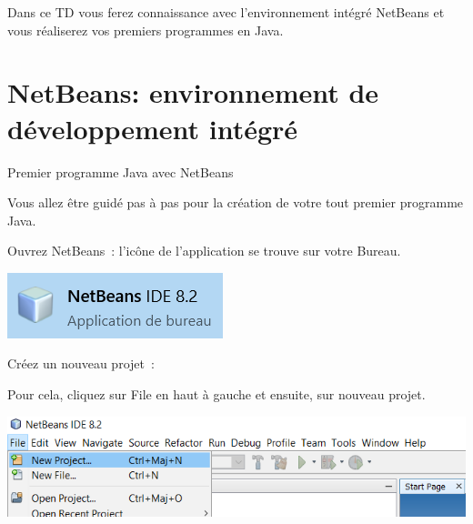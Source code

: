 \documentclass[a4paper,11pt]{article}
\date{2018 -- 2019}
\begin{document}
\entete
\titre

\lastedit


	Dans ce TD vous ferez connaissance avec l'environnement intégré NetBeans et 
	vous réaliserez vos premiers programmes en Java.

	\tableofcontents

	\newpage

\section{NetBeans: environnement de développement intégré }

	\begin{Tutoriel}{Premier programme Java avec NetBeans}
	
	Vous allez être guidé pas à pas pour la création de votre tout premier programme Java.
	
	\begin{steps}
		\item Ouvrez NetBeans~:
			l'icône de l'application se trouve sur votre Bureau. 
		
			\bigskip
			\begin{center}
				\includegraphics{images/nb_icone}
			\end{center}


		\item Créez un nouveau projet~: 
		
			Pour cela, cliquez sur \og File \fg en haut à gauche et ensuite, sur nouveau projet. 
			
			\bigskip
			\begin{center}
				\includegraphics[width=\textwidth]{images/nb_newproject}
			\end{center}
			

\end{steps}
\end{Tutoriel}
\end{document}
